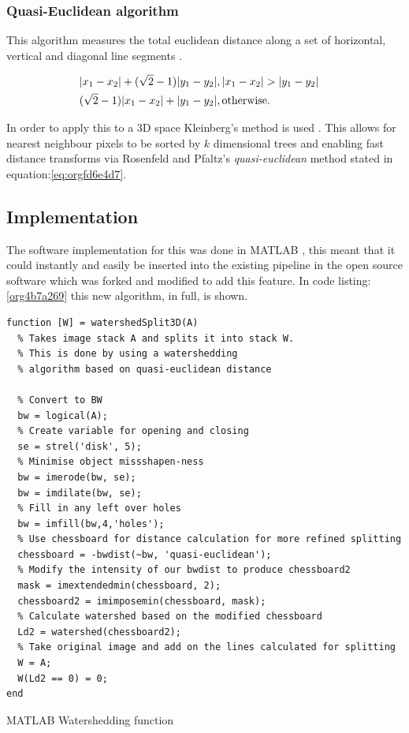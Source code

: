 \documentclass[11pt]{report}
\begin{document}
\subsubsection{Quasi-Euclidean algorithm}
\label{sec:orgc46efd9}

This algorithm measures the total euclidean distance along a set of horizontal, vertical and diagonal
line segments \cite{Pfaltz1966}.

\begin{align}
\label{eq:orgfd6e4d7}
  &\begin{aligned}
&|x_1-x_2|+(\sqrt{2}-1)|y_1-y_2|, |x_1-x_2| > |y_1-y_2| \\
      &(\sqrt{2}-1)|x_1-x_2| + |y_1-y_2|, \textup{otherwise.}
  \end{aligned}
\end{align}

In order to apply this to a 3D space Kleinberg's method is used  \cite{Kleinberg1997}. This allows for nearest neighbour pixels to be sorted by \(k\) dimensional trees
and enabling fast distance transforms via Rosenfeld and Pfaltz's \emph{quasi-euclidean} method stated in equation:\ref{eq:orgfd6e4d7}.

\subsection{Implementation}
\label{sec:orgafb11c9}

The software implementation for this was done in MATLAB \cite{MATHWORKS2017}, this meant that it could instantly and easily be inserted into the existing pipeline in the open source software which was forked and modified to add this feature. In code listing:\ref{org4b7a269} this new algorithm, in full, is shown.

\begin{listing}[htbp]
\begin{verbatim}
function [W] = watershedSplit3D(A)
  % Takes image stack A and splits it into stack W.
  % This is done by using a watershedding
  % algorithm based on quasi-euclidean distance

  % Convert to BW
  bw = logical(A);
  % Create variable for opening and closing
  se = strel('disk', 5);
  % Minimise object missshapen-ness
  bw = imerode(bw, se);
  bw = imdilate(bw, se);
  % Fill in any left over holes
  bw = imfill(bw,4,'holes');
  % Use chessboard for distance calculation for more refined splitting
  chessboard = -bwdist(~bw, 'quasi-euclidean');
  % Modify the intensity of our bwdist to produce chessboard2
  mask = imextendedmin(chessboard, 2);
  chessboard2 = imimposemin(chessboard, mask);
  % Calculate watershed based on the modified chessboard
  Ld2 = watershed(chessboard2);
  % Take original image and add on the lines calculated for splitting
  W = A;
  W(Ld2 == 0) = 0;
end
\end{verbatim}
\caption{\label{org4b7a269}
MATLAB Watershedding function}
\end{listing}
\end{document}
